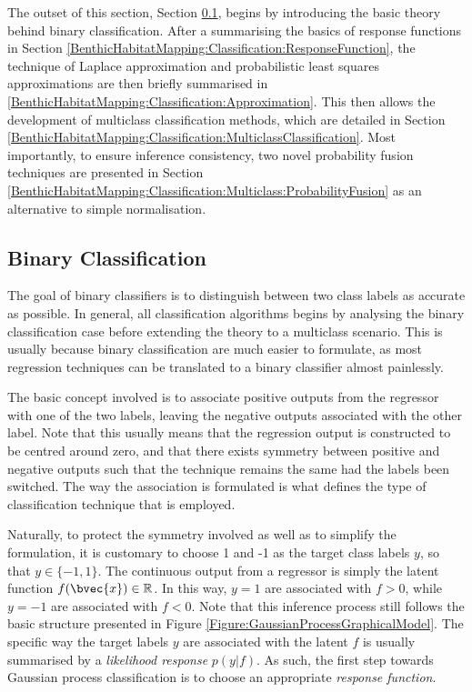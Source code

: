 		The outset of this section, Section \ref{BenthicHabitatMapping:Classification:BinaryClassification}, begins by introducing the basic theory behind binary classification. After a summarising the basics of response functions in Section \ref{BenthicHabitatMapping:Classification:ResponseFunction}, the technique of Laplace approximation and probabilistic least squares approximations are then briefly summarised in \ref{BenthicHabitatMapping:Classification:Approximation}. This then allows the development of multiclass classification methods, which are detailed in Section \ref{BenthicHabitatMapping:Classification:MulticlassClassification}. Most importantly, to ensure inference consistency, two novel probability fusion techniques are presented in Section \ref{BenthicHabitatMapping:Classification:Multiclass:ProbabilityFusion} as an alternative to simple normalisation.
		
		\subsection{Binary Classification}
		\label{BenthicHabitatMapping:Classification:BinaryClassification}
			
			The goal of binary classifiers is to distinguish between two class labels as accurate as possible. In general, all classification algorithms begins by analysing the binary classification case before extending the theory to a multiclass scenario. This is usually because binary classification are much easier to formulate, as most regression techniques can be translated to a binary classifier almost painlessly.
			
			The basic concept involved is to associate positive outputs from the regressor with one of the two labels, leaving the negative outputs associated with the other label. Note that this usually means that the regression output is constructed to be centred around zero, and that there exists symmetry between positive and negative outputs such that the technique remains the same had the labels been switched. The way the association is formulated is what defines the type of classification technique that is employed.
			
			Naturally, to protect the symmetry involved as well as to simplify the formulation, it is customary to choose 1 and -1 as the target class labels $y$, so that $y \in \{-1, 1\}$. The continuous output from a regressor is simply the latent function $f(\bvec{x}) \in \mathbb{R}$. In this way, $y = 1$ are associated with $f > 0$, while $y = -1$ are associated with $f < 0$. Note that this inference process still follows the basic structure presented in Figure \ref{Figure:GaussianProcessGraphicalModel}. The specific way the target labels $y$ are associated with the latent $f$ is usually summarised by a \textit{likelihood response} $p(y | f)$. As such, the first step towards Gaussian process classification is to choose an appropriate \textit{response function}.
			
